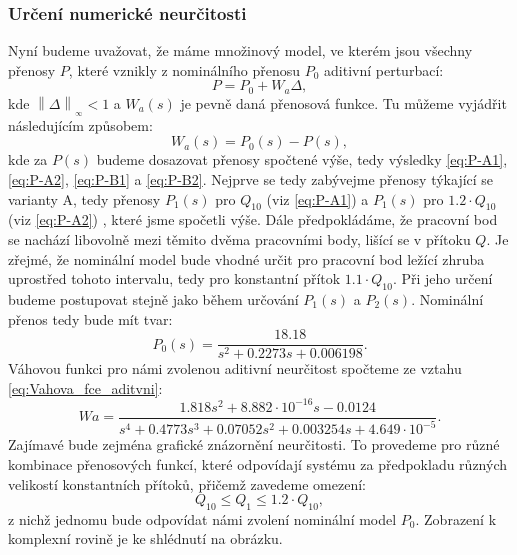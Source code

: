 \documentclass[a4paper,11pt]{article}
\begin{document}
\subsubsection{Určení numerické neurčitosti}
Nyní budeme uvažovat, že máme množinový model, ve kterém jsou všechny přenosy $ P $, které vznikly z nominálního přenosu $ P_{0} $ aditivní perturbací:
\begin{equation}\label{eq:Aditivni_neurcitost-zakladni_vztah} 
P = P_{0}+W_{a}\Delta,
\end{equation}
kde $ \left\| \Delta   \right \|_{_{\infty }}< 1 $ a $ W_{a}\left ( s \right ) $ je pevně daná přenosová funkce. Tu můžeme vyjádřit následujícím způsobem:
\begin{equation}\label{eq:Vahova_fce_aditvni} 
W_{a}\left ( s \right ) = P_{0}\left ( s \right )-P\left ( s \right ),
\end{equation}
kde za $ P\left ( s \right ) $ budeme dosazovat přenosy spočtené výše, tedy výsledky \ref{eq:P-A1}, \ref{eq:P-A2}, \ref{eq:P-B1} a \ref{eq:P-B2}. Nejprve se tedy zabývejme přenosy týkající se varianty A, tedy přenosy $ P_{1}\left ( s \right ) $ pro $ Q_{10} $ (viz \ref{eq:P-A1}) a $ P_{1}\left ( s \right ) $ pro $ 1.2\cdot Q_{10} $ (viz \ref{eq:P-A2}) , které jsme spočetli výše. Dále předpokládáme, že pracovní bod se nachází libovolně mezi těmito dvěma pracovními body, lišící se v přítoku $ Q $. Je zřejmé, že nominální model bude vhodné určit pro pracovní bod ležící zhruba uprostřed tohoto intervalu, tedy pro konstantní přítok $ 1.1\cdot Q_{10} $. Při jeho určení budeme postupovat stejně jako během určování $ P_{1}\left ( s \right ) $ a $ P_{2}\left ( s \right ) $. Nominální přenos tedy bude mít tvar:
\begin{equation}\label{eq:P-A0} 
P_{0}\left ( s \right ) =\frac{18.18}{s^{2} + 0.2273 s + 0.006198}.
\end{equation}
Váhovou funkci pro námi zvolenou aditivní neurčitost spočteme ze vztahu \ref{eq:Vahova_fce_aditvni}:   
\begin{equation}\label{eq:Wa-A}
Wa = \frac{1.818 s^{2} + 8.882\cdot 10^{-16}s - 0.0124}{s^{4} + 0.4773 s^{3} + 0.07052 s^{2} + 0.003254 s + 4.649\cdot 10^{-5}}.
\end{equation} 
Zajímavé bude zejména grafické znázornění neurčitosti. To provedeme pro různé kombinace přenosových funkcí, které odpovídají systému za předpokladu různých velikostí konstantních přítoků, přičemž zavedeme omezení: 
\begin{equation}
\label{eq:Q_omezeni} 
Q_{10} \leq Q_{1} \leq 1.2\cdot Q_{10}, 
\end{equation}
z nichž jednomu bude odpovídat námi zvolení nominální model $ P_{0} $. Zobrazení k komplexní rovině je ke shlédnutí na obrázku.
\end{document}
